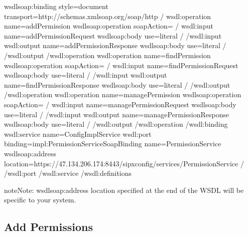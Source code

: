 \documentclass[letterpaper,10pt,english]{sphinxmanual}
\begin{document}
\begin{sphinxVerbatim}[commandchars=\\\{\}]
\PYGZlt{}wsdlsoap:binding style=\PYGZdq{}document\PYGZdq{} transport=\PYGZdq{}http://schemas.xmlsoap.org/soap/http\PYGZdq{} /\PYGZgt{}
\PYGZlt{}wsdl:operation name=\PYGZdq{}addPermission\PYGZdq{}\PYGZgt{}
\PYGZlt{}wsdlsoap:operation soapAction=\PYGZdq{}\PYGZdq{} /\PYGZgt{}
\PYGZlt{}wsdl:input name=\PYGZdq{}addPermissionRequest\PYGZdq{}\PYGZgt{}
\PYGZlt{}wsdlsoap:body use=\PYGZdq{}literal\PYGZdq{} /\PYGZgt{}
\PYGZlt{}/wsdl:input\PYGZgt{}
\PYGZlt{}wsdl:output name=\PYGZdq{}addPermissionResponse\PYGZdq{}\PYGZgt{}
\PYGZlt{}wsdlsoap:body use=\PYGZdq{}literal\PYGZdq{} /\PYGZgt{}
\PYGZlt{}/wsdl:output\PYGZgt{}
\PYGZlt{}/wsdl:operation\PYGZgt{}
\PYGZlt{}wsdl:operation name=\PYGZdq{}findPermission\PYGZdq{}\PYGZgt{}
\PYGZlt{}wsdlsoap:operation soapAction=\PYGZdq{}\PYGZdq{} /\PYGZgt{}
\PYGZlt{}wsdl:input name=\PYGZdq{}findPermissionRequest\PYGZdq{}\PYGZgt{}
\PYGZlt{}wsdlsoap:body use=\PYGZdq{}literal\PYGZdq{} /\PYGZgt{}
\PYGZlt{}/wsdl:input\PYGZgt{}
\PYGZlt{}wsdl:output name=\PYGZdq{}findPermissionResponse\PYGZdq{}\PYGZgt{}
\PYGZlt{}wsdlsoap:body use=\PYGZdq{}literal\PYGZdq{} /\PYGZgt{}
\PYGZlt{}/wsdl:output\PYGZgt{}
\PYGZlt{}/wsdl:operation\PYGZgt{}
\PYGZlt{}wsdl:operation name=\PYGZdq{}managePermission\PYGZdq{}\PYGZgt{}
\PYGZlt{}wsdlsoap:operation soapAction=\PYGZdq{}\PYGZdq{} /\PYGZgt{}
\PYGZlt{}wsdl:input name=\PYGZdq{}managePermissionRequest\PYGZdq{}\PYGZgt{}
\PYGZlt{}wsdlsoap:body use=\PYGZdq{}literal\PYGZdq{} /\PYGZgt{}
\PYGZlt{}/wsdl:input\PYGZgt{}
\PYGZlt{}wsdl:output name=\PYGZdq{}managePermissionResponse\PYGZdq{}\PYGZgt{}
\PYGZlt{}wsdlsoap:body use=\PYGZdq{}literal\PYGZdq{} /\PYGZgt{}
\PYGZlt{}/wsdl:output\PYGZgt{}
\PYGZlt{}/wsdl:operation\PYGZgt{}
\PYGZlt{}/wsdl:binding\PYGZgt{}
\PYGZlt{}wsdl:service name=\PYGZdq{}ConfigImplService\PYGZdq{}\PYGZgt{}
\PYGZlt{}wsdl:port binding=\PYGZdq{}impl:PermissionServiceSoapBinding\PYGZdq{} name=\PYGZdq{}PermissionService\PYGZdq{}\PYGZgt{}
\PYGZlt{}wsdlsoap:address location=\PYGZdq{}https://47.134.206.174:8443/sipxconfig/services/PermissionService\PYGZdq{} /\PYGZgt{}
\PYGZlt{}/wsdl:port\PYGZgt{}
\PYGZlt{}/wsdl:service\PYGZgt{}
\PYGZlt{}/wsdl:definitions\PYGZgt{}
\end{sphinxVerbatim}

\begin{sphinxadmonition}{note}{Note:}
wsdlsoap:address location specified at the end of the WSDL will be specific to your system.
\end{sphinxadmonition}


\subsection{Add Permissions}
\label{\detokenize{soapapi:add-permissions}}
 
\end{document}
